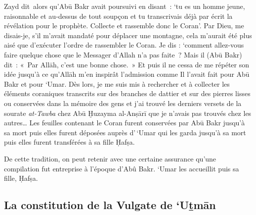 Zayd dit~alors qu'Abū Bakr avait poursuivi en disant~: `tu es un homme
jeune, raisonnable et au-dessus de tout soupçon et tu transcrivais déjà
par écrit la révélation pour le prophète. Collecte et rassemble donc le
Coran'. Par Dieu, me disais-je, s'il m'avait mandaté pour déplacer une
montagne, cela m'aurait été plus aisé que d'exécuter l'ordre de
rassembler le Coran. Je dis : `comment allez-vous faire quelque chose
que le Messager d'Allah n'a pas faite~? Mais il (Abū Bakr) dit~: «~Par
Allāh, c'est une bonne chose.~» Et puis il ne cessa de me répéter son
idée jusqu'à ce qu'Allāh m'en inspirât l'admission comme Il l'avait fait
pour Abū Bakr et pour `Umar. Dès lors, je me suis mis à rechercher et à
collecter les éléments coraniques transcrits sur des branches de dattier
et sur des pierres lisses ou conservées dans la mémoire des gens et j'ai
trouvé les derniers versets de la sourate \emph{at-Tawba} chez Abū
Ḫuzayma al-Anṣārī que je n'avais pas trouvés chez les autres\ldots{} Les
feuilles contenant le Coran furent conservées par Abū Bakr jusqu'à sa
mort puis elles furent déposées auprès d'\,`Umar qui les garda jusqu'à
sa mort puis elles furent transférées à sa fille Ḥafṣa.

De cette tradition, on peut retenir avec une certaine assurance qu'une
compilation fut entreprise à l'époque d'Abû Bakr. `Umar les accueillit
puis sa fille, Ḥafṣa.




\subsection{{La constitution de la Vulgate de `Uṯmān
}}\label{la-constitution-de-la-vulgate-de-uux1e6fmux101n}

